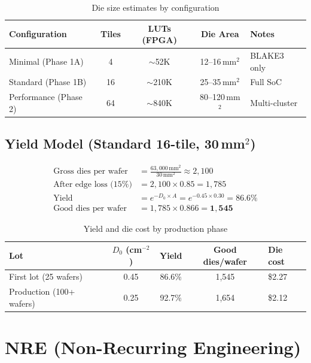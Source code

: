 \documentclass[11pt,a4paper]{article}
\begin{document}
\begin{table}[h]
\centering
\begin{tabular}{lcccl}
\toprule
\textbf{Configuration} & \textbf{Tiles} & \textbf{LUTs (FPGA)} & \textbf{Die Area} & \textbf{Notes} \\
\midrule
Minimal (Phase 1A) & 4 & $\sim$52K & 12--16\,mm$^2$ & BLAKE3 only \\
Standard (Phase 1B) & 16 & $\sim$210K & 25--35\,mm$^2$ & Full SoC \\
Performance (Phase 2) & 64 & $\sim$840K & 80--120\,mm$^2$ & Multi-cluster \\
\bottomrule
\end{tabular}
\caption{Die size estimates by configuration}
\end{table}

\subsection{Yield Model (Standard 16-tile, 30\,mm$^2$)}

\begin{align}
\text{Gross dies per wafer} &= \frac{63{,}000\,\text{mm}^2}{30\,\text{mm}^2} \approx 2{,}100 \\[6pt]
\text{After edge loss (15\%)} &= 2{,}100 \times 0.85 = 1{,}785 \\[6pt]
\text{Yield} &= e^{-D_0 \times A} = e^{-0.45 \times 0.30} = 86.6\% \\[6pt]
\text{Good dies per wafer} &= 1{,}785 \times 0.866 = \mathbf{1{,}545}
\end{align}

\begin{table}[h]
\centering
\begin{tabular}{lcccl}
\toprule
\textbf{Lot} & $D_0$ (cm$^{-2}$) & \textbf{Yield} & \textbf{Good dies/wafer} & \textbf{Die cost} \\
\midrule
First lot (25 wafers) & 0.45 & 86.6\% & 1,545 & \$2.27 \\
Production (100+ wafers) & 0.25 & 92.7\% & 1,654 & \$2.12 \\
\bottomrule
\end{tabular}
\caption{Yield and die cost by production phase}
\end{table}

\section{NRE (Non-Recurring Engineering)}
\end{document}
